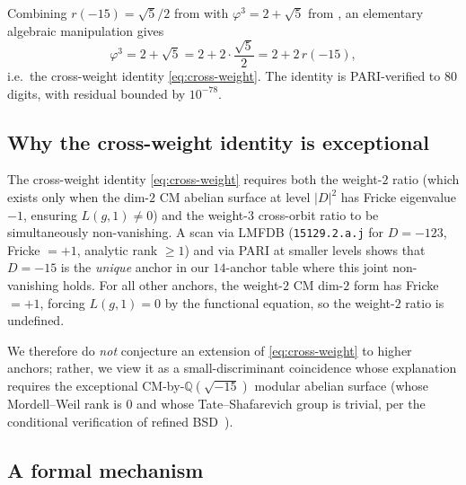 \documentclass[11pt]{amsart}
\theoremstyle{definition}
\theoremstyle{remark}
\newcommand{\Q}{\mathbb{Q}}
\begin{document}
Combining \(r(-15) = \sqrt{5}/2\) from  with
\(\varphi^{3} = 2 + \sqrt{5}\) from , an elementary
algebraic manipulation gives
\[
   \varphi^{3} = 2 + \sqrt{5} = 2 + 2 \cdot \frac{\sqrt{5}}{2}
              = 2 + 2 \, r(-15) ,
\]
i.e.\ the cross-weight identity \eqref{eq:cross-weight}. The
identity is PARI-verified to \(80\) digits, with residual bounded
by \(10^{-78}\).

\subsection{Why the cross-weight identity is exceptional}\label{ssec:cw-rare}

The cross-weight identity \eqref{eq:cross-weight} requires both
the weight-\(2\) ratio (which exists only when the dim-\(2\) CM
abelian surface at level \(|D|^{2}\) has Fricke eigenvalue \(-1\),
ensuring \(L(g, 1) \neq 0\)) and the weight-\(3\) cross-orbit
ratio to be simultaneously non-vanishing. A scan via LMFDB
(\texttt{15129.2.a.j} for \(D = -123\), Fricke \(= +1\),
analytic rank \(\ge 1\)) and via PARI at smaller levels shows that
\(D = -15\) is the \emph{unique} anchor in our \(14\)-anchor table
where this joint non-vanishing holds. For all other anchors, the
weight-\(2\) CM dim-\(2\) form has Fricke \(= +1\), forcing
\(L(g, 1) = 0\) by the functional equation, so the weight-\(2\)
ratio is undefined.

We therefore do \emph{not} conjecture an extension of
\eqref{eq:cross-weight} to higher anchors; rather, we view it as a
small-discriminant coincidence whose explanation requires the
exceptional CM-by-\(\Q(\sqrt{-15})\) modular abelian surface (whose
Mordell--Weil rank is \(0\) and whose Tate--Shafarevich group is
trivial, per the conditional verification of refined
BSD~\cite{MazurTate1987,BurungaleCastellaKim2019}).

\subsection{A formal mechanism}\label{ssec:cw-mechanism}
\end{document}

